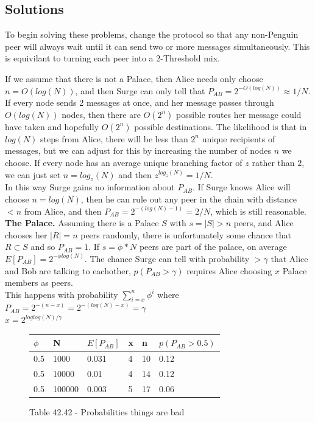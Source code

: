\documentclass{paper}
\begin{document}
\subsection{Solutions}
To begin solving these problems, change the protocol so that any non-Penguin peer will always wait until it can send two or more messages simultaneously. This is equivilant to turning each peer into a 2-Threshold mix. \cite{TODO}

If we assume that there is not a Palace, then Alice needs only choose $n = O(log(N))$, and then Surge can only tell that $P_{AB} = 2^{-O(log(N))} \approx 1/N $. If every node sends 2 messages at once, and her message passes through $O(log(N))$ nodes, then there are $O(2^n)$ possible routes her message could have taken and hopefully $O(2^n)$ possible destinations. The likelihood is that in $log(N)$ steps from Alice, there will be less than $2^n$ unique recipients of messages, but we can adjust for this by increasing the number of nodes $n$ we choose. If every node has an average unique branching factor of $z$ rather than $2$, we can just set $n = log_z(N)$ and then $z^{log_z(N)} = 1/N$.
\\In this way Surge gains no information about $P_{AB}$. If Surge knows Alice will choose $n = log(N)$, then he can rule out any peer in the chain with distance $< n$ from Alice, and then $P_{AB} = 2^{-(log(N)-1)} = 2/N$, which is still reasonable. 
\\
\textbf{The Palace.} Assuming there is a Palace $S$ with $s = |S| > n$ peers, and Alice chooses her $|R| = n$ peers randomly, there is unfortunately some chance that $R \subset S$ and so $P_{AB} = 1$. If $s = \phi*N$ peers are part of the palace, on average $E[P_{AB}] = 2^{-\phi log(N)}$. The chance Surge can tell with probability $> \gamma$ that Alice and Bob are talking to eachother, $p(P_{AB} > \gamma)$ requires Alice choosing $x$ Palace members as peers. 
\\This happens with probability $\sum\limits_{i=x}^n\phi^i$ where 
\\ $P_{AB} = 2^{-(n - x)} = 2^{-(log(N) - x)} = \gamma$
\\ $x = 2^{loglog(N)/\gamma}$

\begin{figure}[ht]
    \begin{tabular}{| l | l | l | l | l | l |}
      \hline
      $\phi$ & N & $E[P_{AB}]$ & x & n & $p(P_{AB} > 0.5)$ \\\hline
      0.5 & 1000 & 0.031 & 4 & 10 & 0.12\\
      0.5 & 10000 & 0.01 & 4 & 14 & 0.12\\
      0.5 & 100000 & 0.003 & 5 & 17 & 0.06\\
      \hline
    \end{tabular}
    \caption{Table 42.42 - Probabilities things are bad}
\end{figure}
\end{document}
